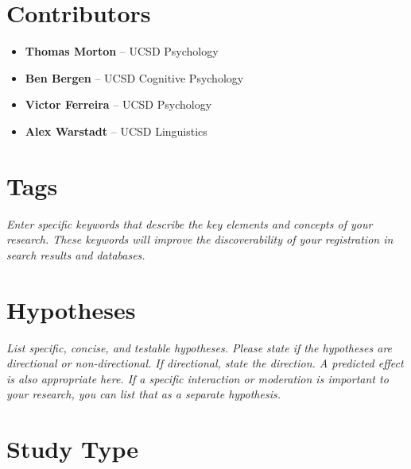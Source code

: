 \documentclass[12pt]{article}
\begin{document}
\section{Contributors}

\begin{itemize}
    \item \textbf{Thomas Morton} -- UCSD Psychology
    \item \textbf{Ben Bergen} -- UCSD Cognitive Psychology
    \item \textbf{Victor Ferreira} -- UCSD Psychology
    \item \textbf{Alex Warstadt} -- UCSD Linguistics
\end{itemize}

\section{Tags}

\textit{Enter specific keywords that describe the key elements and concepts of your research. These keywords will improve the discoverability of your registration in search results and databases.}

\section{Hypotheses}

\textit{List specific, concise, and testable hypotheses. Please state if the hypotheses are directional or non-directional. If directional, state the direction. A predicted effect is also appropriate here. If a specific interaction or moderation is important to your research, you can list that as a separate hypothesis.}

\section{Study Type}
\end{document}

